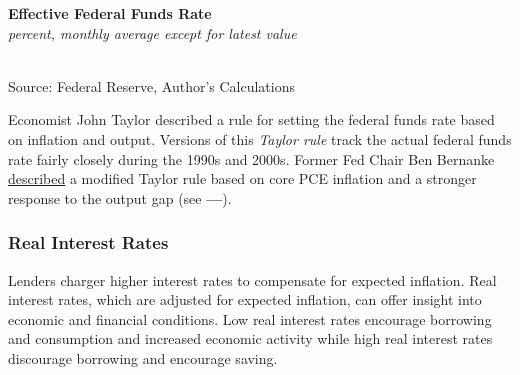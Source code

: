 \documentclass{report}
\makeatletter
\newcommand{\tbllink}[1]{\href{https://raw.githubusercontent.com/bdecon/US-chartbook/master/chartbook/data/#1}{\faTable}}
\newcommand*\short[1]{\expandafter\@gobbletwo\number\numexpr#1\relax}
\newcommand{\absnode}[3]{\node[below right, align=left] at (axis cs: #1,#2) {#3};}
\newcommand{\dateaxisticks}{
		date coordinates in=x, axis line style={draw=none},
		xmax={2023-02-15},
		max space between ticks=40,	    
		xtick={{1990-01-01}, {1992-01-01}, {1994-01-01}, 
			{1996-01-01}, {1998-01-01}, {2000-01-01}, 
			{2002-01-01}, {2004-01-01}, {2006-01-01},
			{2008-01-01}, {2010-01-01}, {2012-01-01}, {2014-01-01},
		    {2016-01-01}, {2018-01-01}, {2020-01-01}, {2022-01-01}, 
		    {2024-01-01}, {2026-01-01}},
		minor xtick={{1989-01-01}, {1991-01-01}, {1993-01-01},
			{1995-01-01}, {1997-01-01}, {1999-01-01}, 
			{2001-01-01}, {2003-01-01}, {2005-01-01}, {2007-01-01},
		    {2009-01-01}, {2011-01-01}, {2013-01-01}, {2015-01-01},
		    {2017-01-01}, {2019-01-01}, {2021-01-01}, {2023-01-01}, 
		    {2025-01-01}, {2027-01-01}},
		enlarge y limits={0.06}, enlarge x limits={0.01},
		}
\newcommand{\bbar}[2]{extra #1 ticks = {{#2}}, extra #1 tick labels = ,
		extra #1 tick style = {grid=major, grid style={thick, black!25}},}
\newcommand{\stdline}[4]{\addplot[very thick, no markers, color=#1] 
		table [x=#2, y=#3, col sep=comma] {#4};	}
\newcommand{\thickline}[4]{\addplot[ultra thick, no markers, color=#1] 
		table [x=#2, y=#3, col sep=comma] {#4};	}
\newcommand{\rbars}{
		\fill[color=black!10] (axis cs:{1990-07-01},\pgfkeysvalueof{/pgfplots/ymin}) rectangle 
			(axis cs:{1991-03-01}, \pgfkeysvalueof{/pgfplots/ymax});
		\fill[color=black!10] (axis cs:{2007-12-01},\pgfkeysvalueof{/pgfplots/ymin}) rectangle 
			(axis cs:{2009-07-01}, \pgfkeysvalueof{/pgfplots/ymax});
		\fill[color=black!10] (axis cs:{2001-03-01},\pgfkeysvalueof{/pgfplots/ymin}) rectangle 
			(axis cs:{2001-11-01}, \pgfkeysvalueof{/pgfplots/ymax});
		\fill[color=black!10] (axis cs:{2020-02-01},\pgfkeysvalueof{/pgfplots/ymin}) rectangle 
			(axis cs:{2020-05-01}, \pgfkeysvalueof{/pgfplots/ymax});}
\makeatother
\begin{document}
{\begin{minipage}{0.76\textwidth}
\normalsize \textbf{Effective Federal Funds Rate}\\
\footnotesize{\textit{percent, monthly average except for latest value }}\\
\hspace*{-2mm} \\
\footnotesize{Source: Federal Reserve, Author's Calculations} \hfill \tbllink{rates.csv}
\vspace{2mm}

\small Economist John Taylor described a rule for setting the federal funds rate based on inflation and output. Versions of this \textit{Taylor rule} track the actual federal funds rate fairly closely during the 1990s and 2000s. Former Fed Chair Ben Bernanke \href{https://www.brookings.edu/blog/ben-bernanke/2015/04/28/the-taylor-rule-a-benchmark-for-monetary-policy/}{described} a modified Taylor rule based on core PCE inflation and a stronger response to the output gap (see {\color{cyan!80!white}\textbf{---}}). 
\end{minipage}
\newpage
\begin{minipage}{0.76\textwidth}
\subsubsection*{Real Interest Rates}
\small Lenders charger higher interest rates to compensate for expected inflation. Real interest rates, which are adjusted for expected inflation, can offer insight into economic and financial conditions. Low real interest rates encourage borrowing and consumption and increased economic activity while high real interest rates discourage borrowing and encourage saving. 


\end{minipage}}
\end{document}
